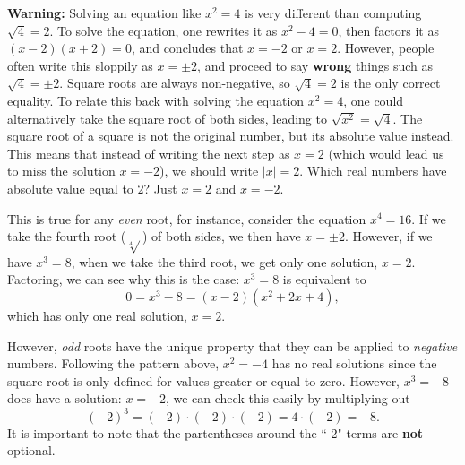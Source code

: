 \documentclass{ximera}
\begin{document}
\begin{callout}
{\bf Warning:} Solving an equation like $x^2 = 4$ is very different than computing $\sqrt{4} = 2$. To solve the equation, one rewrites it as $x^2-4=0$, then factors it as $(x-2)(x+2) = 0$, and concludes that $x=-2$ or $x=2$. However, people often write this sloppily as $x = \pm 2$, and proceed to say {\bf wrong} things such as $\sqrt{4} = \pm 2$. Square roots are always non-negative, so $\sqrt{4}=2$ is the only correct equality. To relate this back with solving the equation $x^2=4$, one could alternatively take the square root of both sides, leading to $\sqrt{x^2} = \sqrt{4}$. The square root of a square is not the original number, but its absolute value instead. This means that instead of writing the next step as $x=2$ (which would lead us to miss the solution $x=-2$), we should write $|x| = 2$. Which real numbers have absolute value equal to $2$? Just $x=2$ and $x=-2$.

This is true for any {\em even} root, for instance, consider the equation $x^4 = 16$. If we take the fourth root ($\sqrt[4]{}$) of both sides, we then have $x = \pm 2$. However, if we have $x^3 = 8$, when we take the third root, we get only one solution, $x=2$. Factoring, we can see why this is the case: $x^3=8$ is equivalent to 
$$0=x^3 - 8=(x-2)(x^2+2x+4),$$
which has only one real solution, $x=2$.

However, {\em odd} roots have the unique property that they can be applied to {\em negative} numbers. Following the pattern above, $x^2=-4$ has no real solutions since the square root is only defined for values greater or equal to zero. However, $x^3=-8$ does have a solution: $x=-2$, we can check this easily by multiplying out 
$$(-2)^3=(-2)\cdot(-2)\cdot(-2) = 4 \cdot (-2) = -8.$$
It is important to note that the partentheses around the ``-2" terms are {\bf not} optional. 
\end{callout}
\end{document}
